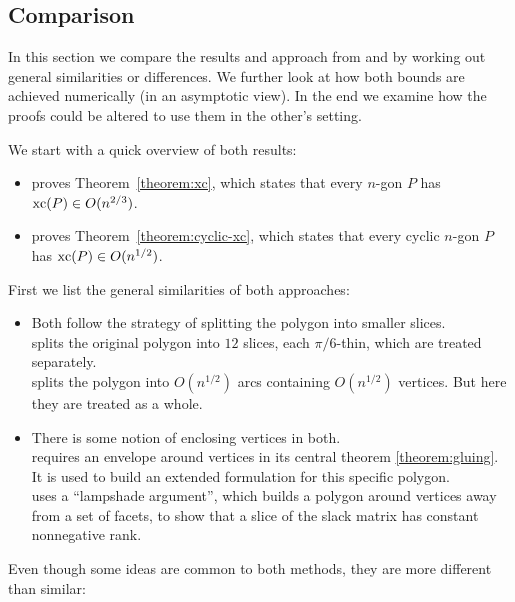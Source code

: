 \subsection{Comparison}

In this section we compare the results and approach from \cite{shitov2020sublinear} and \cite{kwan2020extension} by working out general similarities or differences. We further look at how both bounds are achieved numerically (in an asymptotic view). In the end we examine how the proofs could be altered to use them in the other's setting.

We start with a quick overview of both results:

\begin{itemize}
  \item \cite{shitov2020sublinear} proves Theorem~\ref{theorem:xc}, which states that every $n$-gon $P$ has $\operatorname{xc}(P) \in O(n^{2/3})$.
  \item \cite{kwan2020extension} proves Theorem~\ref{theorem:cyclic-xc}, which states that every cyclic $n$-gon $P$ has $\operatorname{xc}(P) \in O(n^{1/2})$.
\end{itemize}

First we list the general similarities of both approaches:

\begin{itemize}
  \item Both follow the strategy of splitting the polygon into smaller slices.\\
  \cite{shitov2020sublinear} splits the original polygon into $12$ slices, each $\pi/6$-thin, which are treated separately.\\
  \cite{kwan2020extension} splits the polygon into $O(n^{1/2})$ arcs containing $O(n^{1/2})$ vertices. But here they are treated as a whole.

  \item There is some notion of enclosing vertices in both.\\
  \cite{shitov2020sublinear} requires an envelope around vertices in its central theorem \ref{theorem:gluing}. It is used to build an extended formulation for this specific polygon.\\
  \cite{kwan2020extension} uses a ``lampshade argument'', which builds a polygon around vertices away from a set of facets, to show that a slice of the slack matrix has constant nonnegative rank.
\end{itemize}

Even though some ideas are common to both methods, they are more different than similar:

